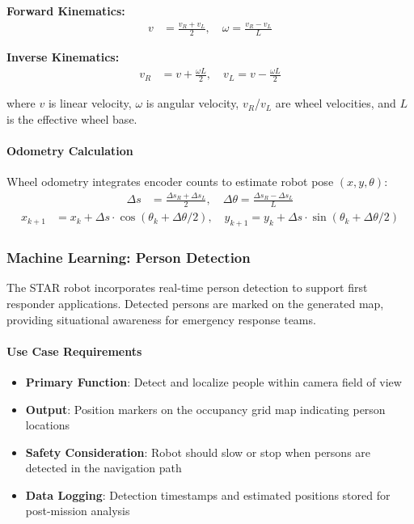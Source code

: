 \textbf{Forward Kinematics:}
\begin{align}
v &= \frac{v_R + v_L}{2}, \quad \omega = \frac{v_R - v_L}{L}
\end{align}

\textbf{Inverse Kinematics:}
\begin{align}
v_R &= v + \frac{\omega L}{2}, \quad v_L = v - \frac{\omega L}{2}
\end{align}

where $v$ is linear velocity, $\omega$ is angular velocity, $v_R$/$v_L$ are wheel velocities, and $L$ is the effective wheel base.

\paragraph{Odometry Calculation}

Wheel odometry integrates encoder counts to estimate robot pose $(x, y, \theta)$:
\begin{align}
\Delta s &= \frac{\Delta s_R + \Delta s_L}{2}, \quad \Delta \theta = \frac{\Delta s_R - \Delta s_L}{L}
\end{align}
\begin{align}
x_{k+1} &= x_k + \Delta s \cdot \cos(\theta_k + \Delta\theta/2), \quad y_{k+1} = y_k + \Delta s \cdot \sin(\theta_k + \Delta\theta/2)
\end{align}

\subsubsection{Machine Learning: Person Detection}

The STAR robot incorporates real-time person detection to support first responder applications. Detected persons are marked on the generated map, providing situational awareness for emergency response teams.

\paragraph{Use Case Requirements}

\begin{itemize}
    \item \textbf{Primary Function}: Detect and localize people within camera field of view
    \item \textbf{Output}: Position markers on the occupancy grid map indicating person locations
    \item \textbf{Safety Consideration}: Robot should slow or stop when persons are detected in the navigation path
    \item \textbf{Data Logging}: Detection timestamps and estimated positions stored for post-mission analysis
\end{itemize}

